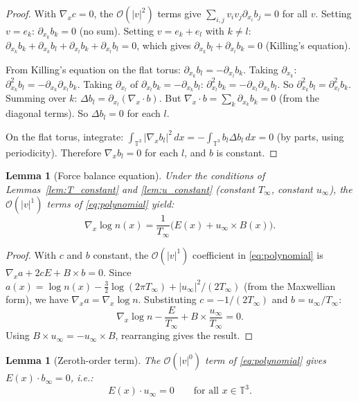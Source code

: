 \documentclass[11pt]{article}
\newcommand{\T}{\mathbb{T}}
\newtheorem{lemma}[theorem]{Lemma}
\begin{document}
\begin{proof}
With $\nabla_x c = 0$, the $\mathcal{O}(|v|^2)$ terms give $\sum_{i,j} v_i v_j \partial_{x_i} b_j = 0$ for all $v$. Setting $v = e_k$: $\partial_{x_k} b_k = 0$ (no sum). Setting $v = e_k + e_l$ with $k \neq l$: $\partial_{x_k} b_k + \partial_{x_k} b_l + \partial_{x_l} b_k + \partial_{x_l} b_l = 0$, which gives $\partial_{x_k} b_l + \partial_{x_l} b_k = 0$ (Killing's equation).

From Killing's equation on the flat torus: $\partial_{x_k} b_l = -\partial_{x_l} b_k$. Taking $\partial_{x_k}$: $\partial_{x_k}^2 b_l = -\partial_{x_k} \partial_{x_l} b_k$. Taking $\partial_{x_l}$ of $\partial_{x_l} b_k = -\partial_{x_k} b_l$: $\partial_{x_l}^2 b_k = -\partial_{x_l} \partial_{x_k} b_l$. So $\partial_{x_k}^2 b_l = \partial_{x_l}^2 b_k$. Summing over $k$: $\Delta b_l = \partial_{x_l}(\nabla_x \cdot b)$. But $\nabla_x \cdot b = \sum_k \partial_{x_k} b_k = 0$ (from the diagonal terms). So $\Delta b_l = 0$ for each $l$.

On the flat torus, integrate: $\int_{\T^3} |\nabla_x b_l|^2 \, dx = -\int_{\T^3} b_l \Delta b_l \, dx = 0$ (by parts, using periodicity). Therefore $\nabla_x b_l = 0$ for each $l$, and $b$ is constant.
\end{proof}

\begin{lemma}[Force balance equation]
\label{lem:force_balance}
Under the conditions of Lemmas~\ref{lem:T_constant} and \ref{lem:u_constant} (constant $T_\infty$, constant $u_\infty$), the $\mathcal{O}(|v|^1)$ terms of \eqref{eq:polynomial} yield:
\[
\nabla_x \log n(x) = \frac{1}{T_\infty}\big(E(x) + u_\infty \times B(x)\big).
\]
\end{lemma}

\begin{proof}
With $c$ and $b$ constant, the $\mathcal{O}(|v|^1)$ coefficient in \eqref{eq:polynomial} is $\nabla_x a + 2c E + B \times b = 0$. Since $a(x) = \log n(x) - \frac{3}{2}\log(2\pi T_\infty) + |u_\infty|^2/(2T_\infty)$ (from the Maxwellian form), we have $\nabla_x a = \nabla_x \log n$. Substituting $c = -1/(2T_\infty)$ and $b = u_\infty/T_\infty$:
\[
\nabla_x \log n - \frac{E}{T_\infty} + B \times \frac{u_\infty}{T_\infty} = 0.
\]
Using $B \times u_\infty = -u_\infty \times B$, rearranging gives the result.
\end{proof}

\begin{lemma}[Zeroth-order term]
\label{lem:zeroth_order}
The $\mathcal{O}(|v|^0)$ term of \eqref{eq:polynomial} gives $E(x) \cdot b_\infty = 0$, i.e.:
\[
E(x) \cdot u_\infty = 0 \qquad \text{for all } x \in \T^3.
\]
\end{lemma}
\end{document}
